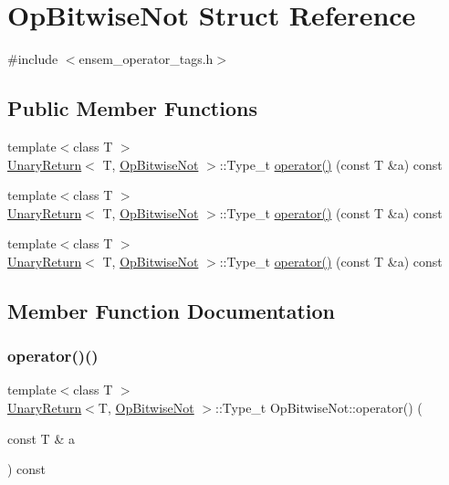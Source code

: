 \hypertarget{structOpBitwiseNot}{}\section{Op\+Bitwise\+Not Struct Reference}
\label{structOpBitwiseNot}


{\ttfamily \#include $<$ensem\+\_\+operator\+\_\+tags.\+h$>$}

\subsection*{Public Member Functions}
\begin{DoxyCompactItemize}
\item 
{\footnotesize template$<$class T $>$ }\\\mbox{\hyperlink{structUnaryReturn}{Unary\+Return}}$<$ T, \mbox{\hyperlink{structOpBitwiseNot}{Op\+Bitwise\+Not}} $>$\+::Type\+\_\+t \mbox{\hyperlink{structOpBitwiseNot_a32565bc96d1f735f04d98179d595ae07}{operator()}} (const T \&a) const
\item 
{\footnotesize template$<$class T $>$ }\\\mbox{\hyperlink{structUnaryReturn}{Unary\+Return}}$<$ T, \mbox{\hyperlink{structOpBitwiseNot}{Op\+Bitwise\+Not}} $>$\+::Type\+\_\+t \mbox{\hyperlink{structOpBitwiseNot_a32565bc96d1f735f04d98179d595ae07}{operator()}} (const T \&a) const
\item 
{\footnotesize template$<$class T $>$ }\\\mbox{\hyperlink{structUnaryReturn}{Unary\+Return}}$<$ T, \mbox{\hyperlink{structOpBitwiseNot}{Op\+Bitwise\+Not}} $>$\+::Type\+\_\+t \mbox{\hyperlink{structOpBitwiseNot_a32565bc96d1f735f04d98179d595ae07}{operator()}} (const T \&a) const
\end{DoxyCompactItemize}


\subsection{Member Function Documentation}
\mbox{\label{structOpBitwiseNot_a32565bc96d1f735f04d98179d595ae07}} 
\subsubsection{\texorpdfstring{operator()()}{operator()()}\hspace{0.1cm}{\footnotesize\ttfamily [1/3]}}
{\footnotesize\ttfamily template$<$class T $>$ \\
\mbox{\hyperlink{structUnaryReturn}{Unary\+Return}}$<$T, \mbox{\hyperlink{structOpBitwiseNot}{Op\+Bitwise\+Not}} $>$\+::Type\+\_\+t Op\+Bitwise\+Not\+::operator() (\begin{DoxyParamCaption}\item[{const T \&}]{a }\end{DoxyParamCaption}) const\hspace{0.3cm}{\ttfamily [inline]}}

